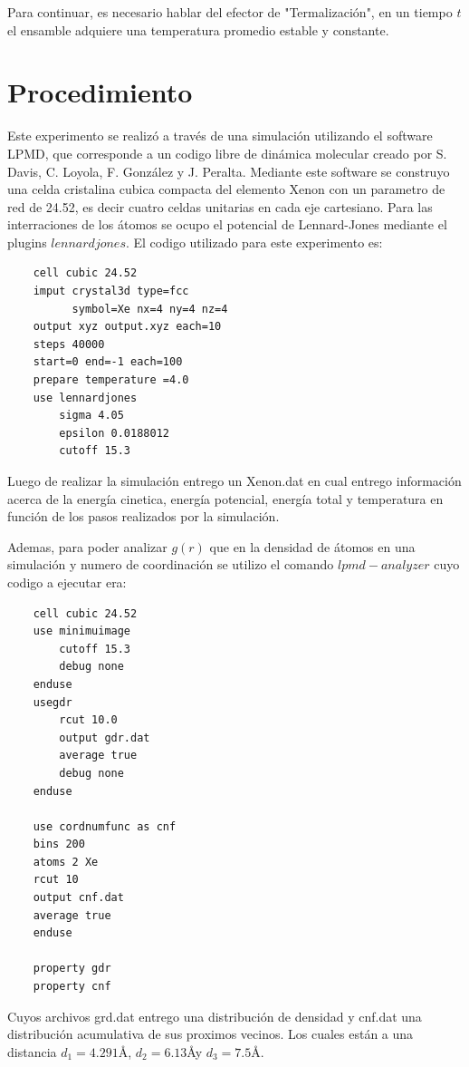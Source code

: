 \documentclass[10pt,letterpaper,twocolumn]{article}
\begin{document}
Para continuar, es necesario hablar del efector de "Termalización", en un tiempo $t$ el ensamble 
adquiere una temperatura promedio estable y constante.

\section*{Procedimiento}

Este experimento se  realizó a través de una simulación utilizando el software LPMD, 
que corresponde a un codigo libre de dinámica molecular creado por S. Davis, C. Loyola, F. González 
y J. Peralta. Mediante este software se construyo una celda cristalina cubica compacta del elemento 
Xenon con un parametro de red de 24.52, es decir cuatro celdas unitarias en cada eje cartesiano. 
Para las interraciones de los átomos se ocupo el potencial de Lennard-Jones mediante el 
plugins $lennardjones$.
El codigo utilizado para este experimento es:

\begin{lstlisting}
    cell cubic 24.52
    imput crystal3d type=fcc 
          symbol=Xe nx=4 ny=4 nz=4
    output xyz output.xyz each=10
    steps 40000
    start=0 end=-1 each=100 
    prepare temperature =4.0
    use lennardjones
        sigma 4.05
        epsilon 0.0188012
        cutoff 15.3
\end{lstlisting}

Luego de realizar la simulación entrego un Xenon.dat en cual entrego información 
acerca de la energía cinetica, energía potencial, energía total y temperatura en
 función de los pasos realizados por la simulación. 

Ademas, para poder analizar $g(r)$ que en la densidad de átomos en una simulación y numero de 
coordinación se utilizo el comando $lpmd-analyzer$ cuyo codigo a ejecutar era:

\begin{lstlisting}
    cell cubic 24.52
    use minimuimage
        cutoff 15.3
        debug none
    enduse
    usegdr
        rcut 10.0
        output gdr.dat
        average true
        debug none
    enduse
    
    use cordnumfunc as cnf
    bins 200
    atoms 2 Xe
    rcut 10
    output cnf.dat
    average true
    enduse

    property gdr
    property cnf
\end{lstlisting}
 
Cuyos archivos grd.dat entrego una distribución de densidad y cnf.dat una distribución 
acumulativa de sus proximos vecinos. Los cuales están a una 
distancia $d_{1}=4.291$\AA , $d_{2}=6.13$\AA y $d_{3}=7.5$\AA.
\end{document}
